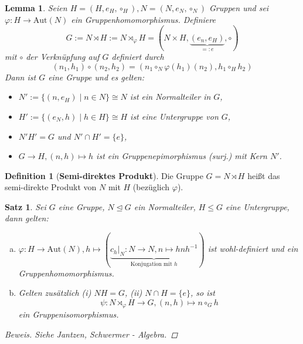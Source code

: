 \documentclass[a4paper]{report}
\theoremstyle{plain}
\newtheorem{lemm}[thm]{Lemma}
\newtheorem{satz}[thm]{Satz}
\theoremstyle{definition}
\newtheorem{defi}[thm]{Definition}
\begin{document}
\begin{lemm}
  Seien $H=(H, e_{H}, \circ_{H}), N=(N, e_{N}, \circ_{N})$ Gruppen und sei $\varphi : H \to \mathrm{Aut}(N)$ ein Gruppenhomomorphismus. Definiere
  $$G:= N \rtimes H:= N \rtimes_{\varphi} H = (N \times H, \underbrace{(e_{n},e_{H})}_{=:e}, \circ)$$
  mit $\circ$ der Verknüpfung auf $G$ definiert durch
  $$(n_{1},h_{1})\circ (n_{2},h_{2}) = (n_{1} \circ_{N} \varphi(h_{1})(n_{2}), h_{1} \circ_{H} h_{2})$$
  Dann ist $G$ eine Gruppe und es gelten:
  \begin{itemize}
\item $N':= \{(n, e_{H}) \mid n \in N\} \cong N$ ist ein Normalteiler in $G$,
    \item $H':= \{(e_{N}, h) \mid h \in H\} \cong H$ ist eine Untergruppe von $G$,
    \item $N'H' = G$ und $N' \cap H' = \{e\}$,
    \item $G \to H, (n,h) \mapsto h$ ist ein Gruppenepimorphismus (surj.) mit Kern $N'$.
  \end{itemize}
\end{lemm}
\begin{defi}[\textbf{Semi-direktes Produkt}]
  Die Gruppe $G = N \rtimes H$ heißt das semi-direkte Produkt von $N$ mit $H$ (bezüglich $\varphi$).
\end{defi}
\begin{satz}
  Sei $G$ eine Gruppe, $N \trianglelefteq G$ ein Normalteiler, $H \le G$ eine Untergruppe, dann gelten:
  \begin{enumerate}[(a)]
    \item $\varphi : H \to \mathrm{Aut}(N), h \mapsto (\underbrace{c_{h}|_{N}: N \to N, n \mapsto hnh^{-1}}_{\text{Konjugation mit }h})$ ist wohl-definiert und ein Gruppenhomomorphismus.
    \item Gelten zusätzlich (i) $NH = G$, (ii) $N \cap H = \{e\}$, so ist
          $$\psi : N \rtimes_{\varphi} H \to G, (n,h) \mapsto n \circ_{G} h$$
          ein Gruppenisomorphismus.
  \end{enumerate}
  \begin{proof}[Beweis]
    Siehe Jantzen, Schwermer - Algebra. %
  \end{proof}
\end{satz}
\end{document}
